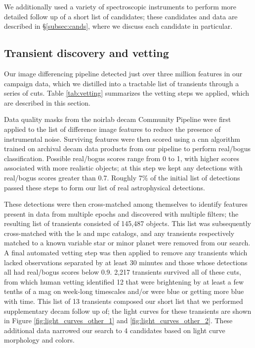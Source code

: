 \documentclass[twocolumn]{aastex631}
\begin{document}
We additionally used a variety of spectroscopic instruments to perform more detailed follow up of a short list of candidates; these candidates and data are described in \S\ref{subsec:cands}, where we discuss each candidate in particular.

\subsection{Transient discovery and vetting}

Our image differencing pipeline detected just over three million features in our campaign data, which we distilled into a tractable list of transients through a series of cuts.
Table \ref{tab:vetting} summarizes the vetting steps we applied, which are described in this section.

Data quality masks from the \gls{noirlab} \gls{decam} Community Pipeline were first applied to the list of difference image features to reduce the presence of instrumental noise.
Surviving features were then scored using a \gls{cnn} algorithm trained on archival \gls{decam} data products from our pipeline to perform real/bogus classification.
Possible real/bogus scores range from 0 to 1, with higher scores associated with more realistic objects; at this step we kept any detections with real/bogus scores greater than 0.7.
Roughly 7\% of the initial list of detections passed these steps to form our list of real astrophysical detections.

These detections were then cross-matched among themselves to identify features present in data from multiple epochs and discovered with multiple filters; the resulting list of transients consisted of 145,487 objects.
This list was subsequently cross-matched with the \gls{ls} and \gls{mpc} catalogs, and any transients respectively matched to a known variable star or minor planet were removed from our search.
A final automated vetting step was then applied to remove any transients which lacked observations separated by at least 30 minutes and those whose detections all had real/bogus scores below 0.9.
2,217 transients survived all of these cuts, from which human vetting identified 12 that were brightening by at least a few tenths of a mag on week-long timescales and/or were blue or getting more blue with time.
This list of 13 transients composed our short list that we performed supplementary \gls{decam} follow up of; the light curves for these transients are shown in Figure \ref{fig:light_curves_other_1} and \ref{fig:light_curves_other_2}.
These additional data narrowed our search to 4 candidates based on light curve morphology and colors.
\end{document}
